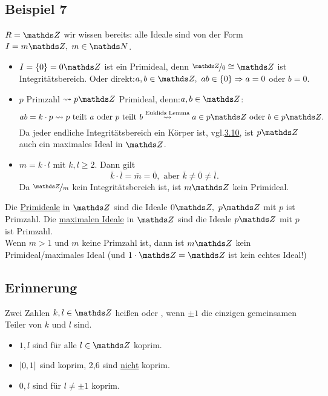 \subsection{Beispiel 7}
\label{sub:bsp_7}
$R=\Z$ wir wissen bereits: alle Ideale sind von der Form $I=m\Z,~m\in \N$.
\begin{itemize}
	\item $I=\{0\}=0\Z$ ist ein Primideal, denn $\nicefrac{\Z}{0}\cong \Z$ ist Integritätsbereich.
	Oder direkt:$a,b\in \Z,~ab\in\{0\}\Rightarrow a=0$ oder $b=0$.
	\item $p$ Primzahl $\rightsquigarrow p\Z$ Primideal, denn:$a,b\in\Z$:
	\[
	ab=k\cdot p\rightsquigarrow p\text{ teilt }a\text{ oder }p\text{ teilt }b\stackrel{\text{Euklids Lemma}}{\rightsquigarrow}a\in p\Z \text{ oder }b\in p\Z.
	\]
	Da jeder endliche Integritätsbereich ein Körper ist, vgl.\hyperref[sub:def_integritaetsbereich]{3.10}, ist $p\Z$ auch ein maximales Ideal in $\Z$.
	\item $m=k\cdot l$ mit $k,l\ge 2$.
	Dann gilt 
	\[
	\overline{k}\cdot\overline{l}=\overline{m}=\overline{0}, \text{ aber }\overline{k}\neq\overline{0}\neq\overline{l}.
	\]
	Da $\nicefrac{\Z}{m}$ kein Integritätsbereich ist, ist $m\Z$ kein Primideal.
\end{itemize}
Die \uline{Primideale} in $\Z$ sind die Ideale $0\Z,~p\Z$ mit $p$ ist Primzahl.
Die \uline{maximalen Ideale} in $\Z$ sind die Ideale $p\Z$ mit $p$ ist Primzahl.\\
Wenn $m>1$ und $m$ keine Primzahl ist, dann ist $m\Z$ kein Primideal/maximales Ideal (und $1\cdot \Z=\Z$ ist kein echtes Ideal!)


\subsection{Erinnerung}
\label{sub:erinnerung}
Zwei Zahlen $k,l\in \Z$ heißen  oder , wenn $\pm 1$ die einzigen gemeinsamen Teiler von $k$ und $l$ sind.\\

\begin{itemize}
	\item $1,l$ sind für alle $l\in \Z$ koprim.
	\item $\left\vert0,1\right\vert$ sind koprim, 2,6 sind \uline{nicht} koprim.
	\item $0,l$ sind für $l\neq\pm 1$ koprim.
\end{itemize}

